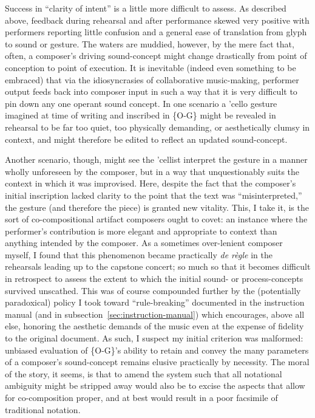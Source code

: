     Success in ``clarity of intent'' is a little more difficult to assess. As described above, feedback during rehearsal and after performance skewed very positive with performers reporting little confusion and a general ease of translation from glyph to sound or gesture. The waters are muddied, however, by the mere fact that, often, a composer's driving sound-concept might change drastically from point of conception to point of execution. It is inevitable (indeed even something to be embraced) that via the idiosyncrasies of collaborative music-making, performer output feeds back into composer input in such a way that it is very difficult to pin down any one operant sound concept. In one scenario a 'cello gesture imagined at time of writing and inscribed in \{O-G\} might be revealed in rehearsal to be far too quiet, too physically demanding, or aesthetically clumsy in context, and might therefore be edited to reflect an updated sound-concept. 
    
    Another scenario, though, might see the 'cellist interpret the gesture in a manner wholly unforeseen by the composer, but in a way that unquestionably suits the context in which it was improvised. Here, despite the fact that the composer's initial inscription lacked clarity to the point that the text was ``misinterpreted,'' the gesture (and therefore the piece) is granted new vitality. This, I take it, is the sort of co-compositional artifact composers ought to covet: an instance where the performer's contribution is more elegant and appropriate to context than anything intended by the composer. As a sometimes over-lenient composer myself, I found that this phenomenon became practically \textit{de r\`{e}gle} in the rehearsals leading up to the capstone concert; so much so that it becomes difficult in retrospect to assess the extent to which the initial sound- or process-concepts survived unscathed. This was of course compounded further by the (potentially paradoxical) policy I took toward ``rule-breaking'' documented in the instruction manual (and in subsection~\ref{sec:instruction-manual}) which encourages, above all else, honoring the aesthetic demands of the music even at the expense of fidelity to the original document. As such, I suspect my initial criterion was malformed: unbiased evaluation of \{O-G\}'s ability to retain and convey the many parameters of a composer's sound-concept remains elusive practically by necessity. The moral of the story, it seems, is that to amend the system such that all notational ambiguity might be stripped away would also be to excise the aspects that allow for co-composition proper, and at best would result in a poor facsimile of traditional notation.

